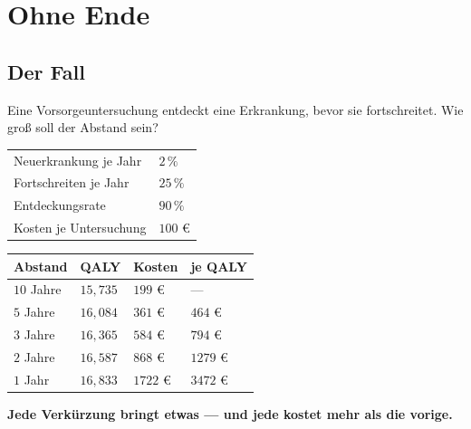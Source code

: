 \chapter{Ohne Ende}

\section{Der Fall}

\begin{merksatz}
Eine Vorsorgeuntersuchung entdeckt eine Erkrankung, bevor sie fortschreitet. Wie groß soll der Abstand sein?

\begin{center}
{\small
\renewcommand{\arraystretch}{1.5}
\begin{tabular}{@{}P{3.0cm}P{2.4cm}@{}}
\toprule
Neuerkrankung je Jahr & $2\,\%$\\
Fortschreiten je Jahr & $25\,\%$\\
Entdeckungsrate & $90\,\%$\\
Kosten je Untersuchung & $100$ €\\
\bottomrule
\end{tabular}}
\end{center}

\begin{center}
{\small
\renewcommand{\arraystretch}{1.48}
\begin{tabular}{@{}P{2.4cm}P{2.2cm}P{2.2cm}P{2.2cm}@{}}
\toprule
\textbf{Abstand} & \textbf{QALY} & \textbf{Kosten} & \textbf{je QALY}\\
\midrule
$10$ Jahre & $15{,}735$ & $199$ € & ---\\
$5$ Jahre & $16{,}084$ & $361$ € & $464$ €\\
$3$ Jahre & $16{,}365$ & $584$ € & $794$ €\\
$2$ Jahre & $16{,}587$ & $868$ € & $1279$ €\\
$1$ Jahr & $16{,}833$ & $1722$ € & $3472$ €\\
\bottomrule
\end{tabular}}
\end{center}

\begin{center}
\begin{minipage}{0.9\textwidth}
\textbf{Jede Verkürzung bringt etwas --- und jede kostet mehr als die vorige.}
\end{minipage}
\end{center}

\begin{center}
\begin{minipage}{0.88\textwidth}
\end{minipage}
\end{center}
\end{merksatz}

